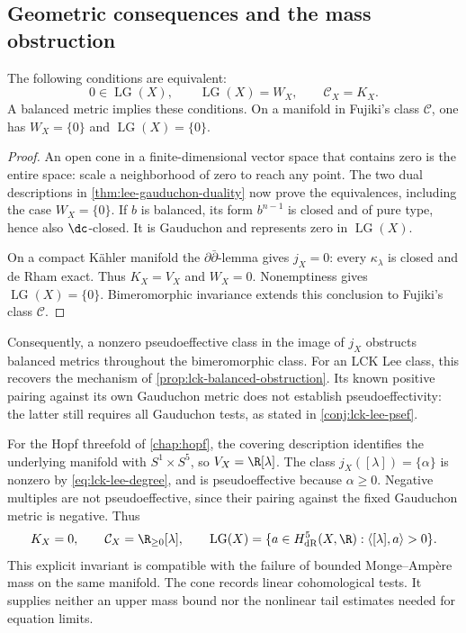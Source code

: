 \subsection{Geometric consequences and the mass obstruction}

\begin{corollary}\label{cor:lee-gauduchon-zero}
The following conditions are equivalent:
\[
 0\in\operatorname{LG}(X),\qquad
 \operatorname{LG}(X)=W_X,\qquad
 \mathcal C_X=K_X.
\]
A balanced metric implies these conditions. On a manifold in Fujiki's class $\mathcal C$, one has $W_X=\{0\}$ and $\operatorname{LG}(X)=\{0\}$.
\end{corollary}
\begin{proof}
An open cone in a finite-dimensional vector space that contains zero is the entire space: scale a neighborhood of zero to reach any point. The two dual descriptions in \cref{thm:lee-gauduchon-duality} now prove the equivalences, including the case $W_X=\{0\}$. If $b$ is balanced, its form $b^{n-1}$ is closed and of pure type, hence also $\dc$-closed. It is Gauduchon and represents zero in $\operatorname{LG}(X)$.

On a compact K\"ahler manifold the $\partial\bar\partial$-lemma gives $j_X=0$: every $\kappa_\lambda$ is closed and de Rham exact. Thus $K_X=V_X$ and $W_X=0$. Nonemptiness gives $\operatorname{LG}(X)=\{0\}$. Bimeromorphic invariance extends this conclusion to Fujiki's class $\mathcal C$.
\end{proof}

Consequently, a nonzero pseudoeffective class in the image of $j_X$ obstructs balanced metrics throughout the bimeromorphic class. For an LCK Lee class, this recovers the mechanism of \cref{prop:lck-balanced-obstruction}. Its known positive pairing against its own Gauduchon metric does not establish pseudoeffectivity: the latter still requires all Gauduchon tests, as stated in \cref{conj:lck-lee-psef}.

For the Hopf threefold of \cref{chap:hopf}, the covering description identifies the underlying manifold with $S^1\times S^5$, so $V_X=\R[\lambda]$. The class $j_X([\lambda])=\{\alpha\}$ is nonzero by \eqref{eq:lck-lee-degree}, and is pseudoeffective because $\alpha\geq0$. Negative multiples are not pseudoeffective, since their pairing against the fixed Gauduchon metric is negative. Thus
\[
 K_X=0,\qquad \mathcal C_X=\R_{\geq0}[\lambda],\qquad
 \operatorname{LG}(X)=\{a\in H^5_{\mathrm{dR}}(X,\R):
                                  \langle[\lambda],a\rangle>0\}.
\]
This explicit invariant is compatible with the failure of bounded Monge--Amp\`ere mass on the same manifold. The cone records linear cohomological tests. It supplies neither an upper mass bound nor the nonlinear tail estimates needed for equation limits.
